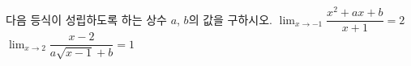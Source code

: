 다음 등식이 성립하도록 하는 상수 $a$, $b$의 값을 구하시오.
 $\displaystyle\lim_{x\to -1}\dfrac{x^2+ax+b}{x+1}=2$
 $\displaystyle\lim_{x\to 2}\dfrac{x-2}{a\sqrt{x-1}+b}=1$
